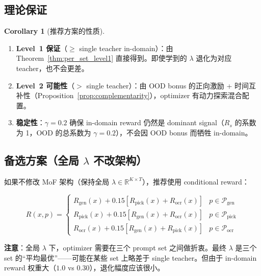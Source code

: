 \documentclass[11pt,a4paper]{article}
\newcommand{\R}{\mathbb{R}}
\newcommand{\reward}{R}
\theoremstyle{definition}
\newtheorem{corollary}{Corollary}
\begin{document}
\subsection{理论保证}

\begin{corollary}[推荐方案的性质]
\begin{enumerate}[leftmargin=1.5em]
\item \textbf{Level~1 保证}（$\geq$ single teacher in-domain）：由 Theorem~\ref{thm:per_set_level1} 直接得到。即使学到的 $\lambda$ 退化为对应 teacher，也不会更差。

\item \textbf{Level~2 可能性}（$>$ single teacher）：由 OOD bonus 的正向激励 + 时间互补性（Proposition~\ref{prop:complementarity}），optimizer 有动力探索混合配置。

\item \textbf{稳定性}：$\gamma = 0.2$ 确保 in-domain reward 仍然是 dominant signal（$R_s$ 的系数为 1，OOD 的总系数为 $\gamma = 0.2$），不会因 OOD bonus 而牺牲 in-domain。
\end{enumerate}
\end{corollary}

\subsection{备选方案（全局 $\lambda$ 不改架构）}

如果不修改 MoF 架构（保持全局 $\lambda \in \R^{K \times T}$），推荐使用 conditional reward：

\begin{tcolorbox}[colback=blue!5, colframe=blue!40, title=备选方案（全局 $\lambda$）]
\begin{equation}
\reward(x, p) = \begin{cases}
R_{\mathrm{gen}}(x) + 0.15[R_{\mathrm{pick}}(x) + R_{\mathrm{ocr}}(x)] & p \in \mathcal{P}_{\mathrm{gen}} \\
R_{\mathrm{pick}}(x) + 0.15[R_{\mathrm{gen}}(x) + R_{\mathrm{ocr}}(x)] & p \in \mathcal{P}_{\mathrm{pick}} \\
R_{\mathrm{ocr}}(x) + 0.15[R_{\mathrm{gen}}(x) + R_{\mathrm{pick}}(x)] & p \in \mathcal{P}_{\mathrm{ocr}}
\end{cases}
\end{equation}

\textbf{注意}：全局 $\lambda$ 下，optimizer 需要在三个 prompt set 之间做折衷。最终 $\lambda$ 是三个 set 的``平均最优''——可能在某些 set 上略差于 single teacher。但由于 in-domain reward 权重大（$1.0$ vs $0.30$），退化幅度应该很小。
\end{tcolorbox}
\end{document}
